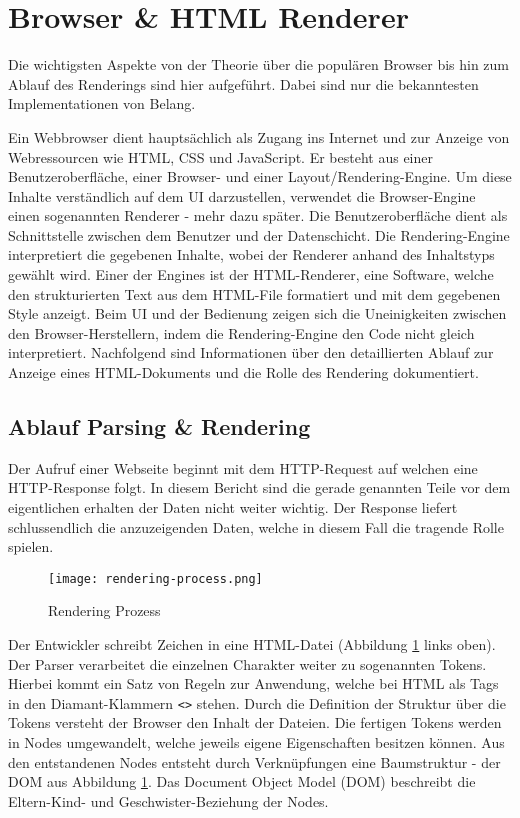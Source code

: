 \section{Browser \& HTML Renderer}
\label{sec:browserRenderer}

Die wichtigsten Aspekte von der Theorie über die populären Browser bis hin zum Ablauf des Renderings sind hier aufgeführt.
Dabei sind nur die bekanntesten Implementationen von Belang.

Ein Webbrowser dient hauptsächlich als Zugang ins Internet und zur Anzeige von Webressourcen wie HTML, CSS und JavaScript.
Er besteht aus einer Benutzeroberfläche, einer Browser- und einer Layout/Rendering-Engine.
Um diese Inhalte verständlich auf dem UI darzustellen, verwendet die Browser-Engine einen sogenannten Renderer - mehr dazu später.
Die Benutzeroberfläche dient als Schnittstelle zwischen dem Benutzer und der Datenschicht. 
Die Rendering-Engine interpretiert die gegebenen Inhalte, wobei der Renderer anhand des Inhaltstyps gewählt wird. 
Einer der Engines ist der HTML-Renderer, eine Software, welche den strukturierten Text aus dem HTML-File formatiert und mit dem gegebenen Style anzeigt.
Beim UI und der Bedienung zeigen sich die Uneinigkeiten zwischen den Browser-Herstellern, indem die Rendering-Engine den Code nicht gleich interpretiert.
Nachfolgend sind Informationen über den detaillierten Ablauf zur Anzeige eines HTML-Dokuments und die Rolle des Rendering dokumentiert.


\subsection{Ablauf Parsing \& Rendering}
\label{sec:parsingRendering}

Der Aufruf einer Webseite beginnt mit dem HTTP-Request auf welchen eine HTTP-Response folgt.
In diesem Bericht sind die gerade genannten Teile vor dem eigentlichen erhalten der Daten nicht weiter wichtig.
Der Response liefert schlussendlich die anzuzeigenden Daten, welche in diesem Fall die tragende Rolle spielen.

\begin{figure}[!htb]
    \centering
    \texttt{[image: rendering-process.png]}
    \caption{Rendering Prozess}
    \label{img:RenderingProcess}
\end{figure}

Der Entwickler schreibt Zeichen in eine HTML-Datei (Abbildung \ref{img:RenderingProcess} links oben).
Der Parser verarbeitet die einzelnen Charakter weiter zu sogenannten Tokens.
Hierbei kommt ein Satz von Regeln zur Anwendung, welche bei HTML als Tags in den Diamant-Klammern \texttt{<>} stehen.
Durch die Definition der Struktur über die Tokens versteht der Browser den Inhalt der Dateien.
Die fertigen Tokens werden in Nodes umgewandelt, welche jeweils eigene Eigenschaften besitzen können.
Aus den entstandenen Nodes entsteht durch Verknüpfungen eine Baumstruktur - der DOM aus Abbildung \ref{img:RenderingProcess}.
Das Document Object Model (DOM) beschreibt die Eltern-Kind- und Geschwister-Beziehung der Nodes.

